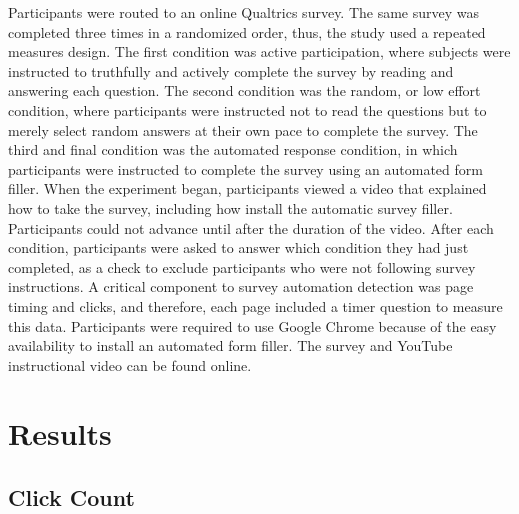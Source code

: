 \documentclass[english,man]{apa6}
\theoremstyle{definition}
\theoremstyle{definition}
\theoremstyle{definition}
\theoremstyle{remark}
\begin{document}
Participants were routed to an online Qualtrics survey. The same survey
was completed three times in a randomized order, thus, the study used a
repeated measures design. The first condition was active participation,
where subjects were instructed to truthfully and actively complete the
survey by reading and answering each question. The second condition was
the random, or low effort condition, where participants were instructed
not to read the questions but to merely select random answers at their
own pace to complete the survey. The third and final condition was the
automated response condition, in which participants were instructed to
complete the survey using an automated form filler. When the experiment
began, participants viewed a video that explained how to take the
survey, including how install the automatic survey filler. Participants
could not advance until after the duration of the video. After each
condition, participants were asked to answer which condition they had
just completed, as a check to exclude participants who were not
following survey instructions. A critical component to survey automation
detection was page timing and clicks, and therefore, each page included
a timer question to measure this data. Participants were required to use
Google Chrome because of the easy availability to install an automated
form filler. The survey and YouTube instructional video can be found
online.

\section{Results}\label{results-1}

\subsection{Click Count}\label{click-count-1}
\end{document}
